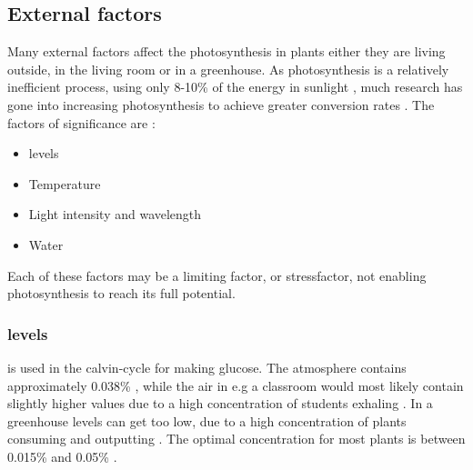 \subsection{External factors}
Many external factors affect the photosynthesis in plants either they are living outside, in the living room or in a greenhouse. As photosynthesis is a relatively inefficient process, using only 8-10\% of the energy in sunlight \citetext{Long et. al, 2006; Zhu et. al, 2010, referenced in \citealp{kirschbaum2011does}}, much research has gone into increasing photosynthesis to achieve greater conversion rates \citetext{Reynolds et al., 2000; Sinclair et al., 2004; Long et al., 2006; Zhu et al., 2010, referenced in \citealp{kirschbaum2011does}}. The factors of significance are \citep{bios}:
\begin{itemize}
\item {} levels
\item Temperature
\item Light intensity and wavelength
\item Water
\end{itemize}
Each of these factors may be a limiting factor, or stressfactor, not enabling photosynthesis to reach its full potential. 

\subsubsection{ levels}
 is used in the calvin-cycle for making glucose. The atmosphere contains approximately 0.038\% , while the air in e.g a classroom would most likely contain slightly higher values due to a high concentration of students exhaling . In a greenhouse  levels can get too low, due to a high concentration of plants consuming  and outputting . The optimal concentration for most plants is between 0.015\% and 0.05\% \citep{bios}. 


